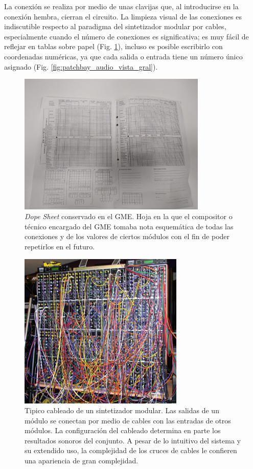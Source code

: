 La conexión se realiza por medio de unas clavijas que, al introducirse en la conexión hembra, cierran el circuito. La limpieza visual de las conexiones es indiscutible respecto al paradigma del sintetizador modular por cables, especialmente cuando el número de conexiones es significativa; es muy fácil de reflejar en tablas sobre papel (Fig. \ref{fig:dope_sheet_GME}), incluso es posible escribirlo con coordenadas numéricas, ya que cada salida o entrada tiene un número único asignado (Fig. \ref{fig:patchbay_audio_vista_gral}).

\begin{figure}
	\centering
	\includegraphics[width=0.8\textwidth]{images/dope_sheet_GME}
	\caption[\textit{Dope Sheet} conservado en el GME]{\textit{Dope Sheet} conservado en el GME. Hoja en la que el compositor o técnico encargado del GME tomaba nota esquemática de todas las conexiones y de los valores de ciertos módulos con el fin de poder repetirlos en el futuro.}
	\label{fig:dope_sheet_GME}
\end{figure}

\begin{figure}
	\centering
	\includegraphics[width=0.7\textwidth]{images/sinte_modular}
	\caption[Tipico cableado de un sintetizador modular]{Tipico cableado de un sintetizador modular. Las salidas de un módulo se conectan por medio de cables con las entradas de otros módulos. La configuración del cableado determina en parte los resultados sonoros del conjunto. A pesar de lo intuitivo del sistema y su extendido uso, la complejidad de los cruces de cables le confieren una apariencia de gran complejidad.}
	\label{fig:sintetizador_modular}
\end{figure}

